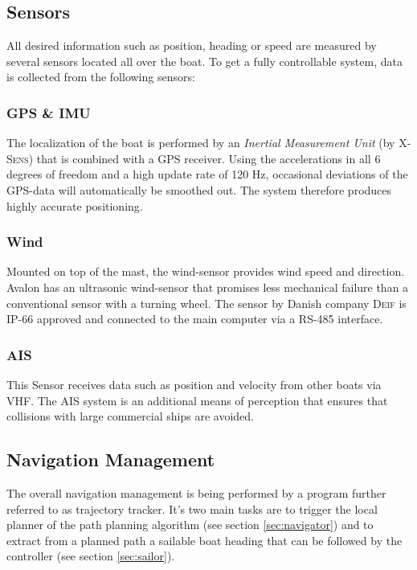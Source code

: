 %
%
\subsection{Sensors} \label{sec:sensors}
All desired information such as position, heading or speed are measured by
several sensors located all over the boat. To get a fully controllable system,
data is collected from the following sensors:
%
\subsubsection{GPS \& IMU} 
The localization of the boat is performed by an \textit{Inertial Measurement
Unit} (by \textsc{X-Sens}) that is combined with a GPS receiver. Using the
accelerations in all 6 degrees of freedom and a high update rate of 120 Hz,
occasional deviations of the GPS-data will automatically be smoothed out. The
system therefore produces highly accurate positioning.
%
\subsubsection{Wind} Mounted on top of the mast, the wind-sensor provides wind
speed and direction. {\sc Avalon} has an ultrasonic wind-sensor that promises
less mechanical failure than a conventional sensor with a turning wheel. The
sensor by Danish company \textsc{Deif} is IP-66 approved and connected to the
main computer via a RS-485 interface.
\subsubsection{AIS} This Sensor receives data such as position and velocity
from other boats via VHF. The AIS system is an additional means of perception
that ensures that collisions with large commercial ships are avoided.
%
\subsection{Navigation Management} \label{sec:skipper}
The overall navigation management is being performed by a program further
referred to as trajectory tracker. It's two main tasks are to trigger the local
planner of the path planning algorithm (see section \ref{sec:navigator}) and to
extract from a planned path a sailable boat heading that can be followed by the
controller (see section \ref{sec:sailor}).

